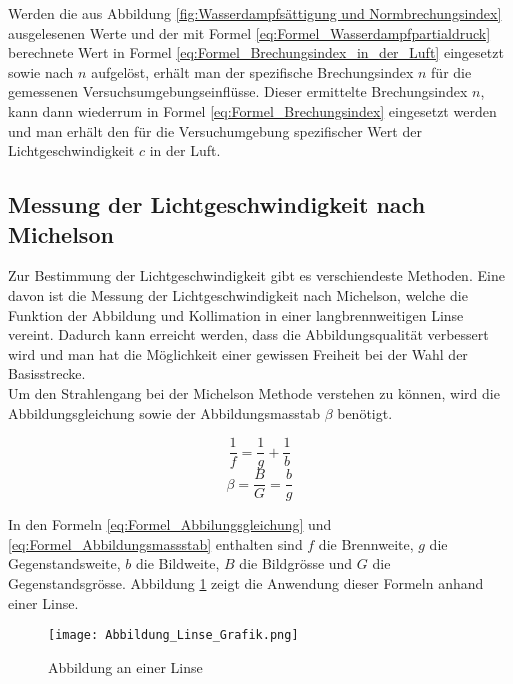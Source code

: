 Werden die aus Abbildung \ref{fig:Wasserdampfsättigung und Normbrechungsindex} ausgelesenen Werte und der mit Formel \ref{eq:Formel_Wasserdampfpartialdruck} berechnete Wert in Formel \ref{eq:Formel_Brechungsindex_in_der_Luft} eingesetzt sowie nach $n$ aufgelöst, erhält man der spezifische Brechungsindex $n$ für die gemessenen Versuchsumgebungseinflüsse. Dieser ermittelte Brechungsindex $n$, kann dann wiederrum in Formel \ref{eq:Formel_Brechungsindex} eingesetzt werden und man erhält den für die Versuchumgebung spezifischer Wert der Lichtgeschwindigkeit $c$ in der Luft. 

\subsection{Messung der Lichtgeschwindigkeit nach Michelson}

Zur Bestimmung der Lichtgeschwindigkeit gibt es verschiendeste Methoden. Eine davon ist die Messung der Lichtgeschwindigkeit nach Michelson, welche die Funktion der Abbildung und Kollimation in einer langbrennweitigen Linse vereint. Dadurch kann erreicht werden, dass die Abbildungsqualität verbessert wird und man hat die Möglichkeit einer gewissen Freiheit bei der Wahl der Basisstrecke.\\[4mm]
Um den Strahlengang bei der Michelson Methode verstehen zu können, wird die Abbildungsgleichung sowie der Abbildungsmasstab $\beta$ benötigt.

\begin{equation}
\dfrac{1}{f} = \dfrac{1}{g} + \dfrac{1}{b}
\label{eq:Formel_Abbilungsgleichung}
\end{equation}
\begin{equation}
\beta = \frac{B}{G} = \frac{b}{g}
\label{eq:Formel_Abbildungsmassstab}
\end{equation}

In den Formeln \ref{eq:Formel_Abbilungsgleichung} und \ref{eq:Formel_Abbildungsmassstab} enthalten sind $f$ die Brennweite, $g$ die Gegenstandsweite, $b$ die Bildweite, $B$ die Bildgrösse und $G$ die Gegenstandsgrösse. Abbildung \ref{fig:Abbildung an einer Linse} zeigt die Anwendung dieser Formeln anhand einer Linse.

\begin{figure}[htb]
\texttt{[image: Abbildung\_Linse\_Grafik.png]}
\caption{Abbildung an einer Linse}
\label{fig:Abbildung an einer Linse}
\end{figure}

